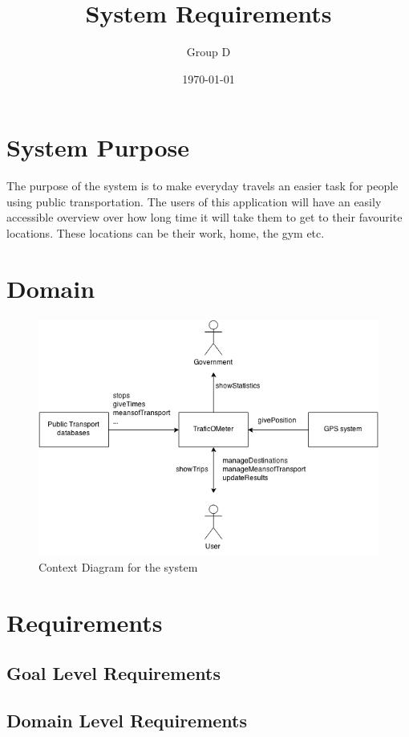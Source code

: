\documentclass[a4paper]{article}
\title{System Requirements}
\author{Group D}
\date{\today}
\begin{document}
	\maketitle
	\thispagestyle{empty}
	\setcounter{page}{0}
	\pagebreak
	\tableofcontents
	\pagebreak
	

	\section{System Purpose} %
	The purpose of the system is to make everyday travels an easier task for people using public transportation. The users of this application will have an easily accessible overview over how long time it will take them to get to their favourite locations. These locations can be their work, home, the gym etc.
	\section{Domain}
		\begin{figure}[h]
				\includegraphics[scale=0.65]{Context-v1.png}
			\caption{Context Diagram for the system}
		\end{figure}
	\newpage
	
	\section{Requirements}
		\subsection{Goal Level Requirements}
			
		\subsection{Domain Level Requirements}
\end{document}
